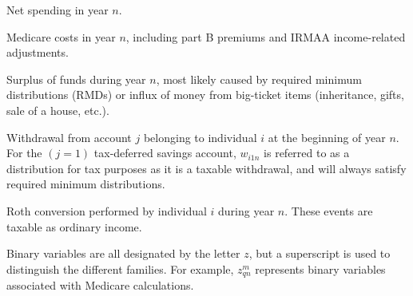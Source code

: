 \documentclass{report}[fleqn,12pt]
\begin{document}
\begin{description}[leftmargin=4em,style=multiline]
\item [$g_n$]
	Net spending in year $n$.
\item [$m_n$]
	Medicare costs in year $n$, including part B premiums and IRMAA income-related adjustments.
\item [$s_{n}$]
	Surplus of funds during year $n$, most likely caused by required minimum distributions (RMDs)
	or influx of money from big-ticket items (inheritance, gifts, sale of a house, etc.).
\item [$w_{ijn}$]
	Withdrawal from account $j$ belonging to individual $i$ at the beginning of year $n$.
	For the $(j=1)$ tax-deferred savings account, $w_{i1n}$ is referred to as a distribution for
	tax purposes as it is a taxable withdrawal, and will always satisfy required minimum distributions.
\item [$x_{in}$]
	Roth conversion performed by individual $i$ during year $n$.
	These events are taxable as ordinary income.
\item [$z_{*}^*$]
	Binary variables are all designated by the letter $z$, but a superscript is
	used to distinguish the different families. For example, $z_{qn}^m$ represents
	binary variables associated with Medicare calculations.
\end{description}
\end{document}
